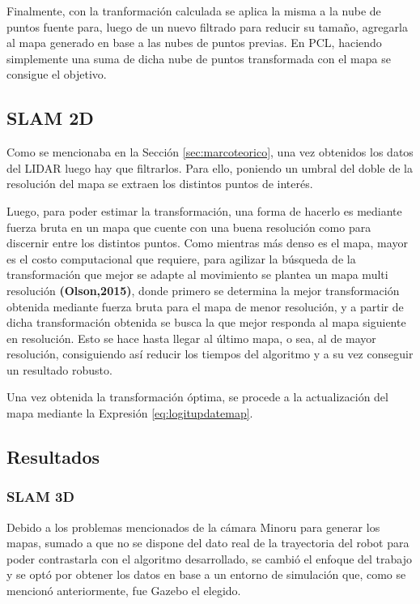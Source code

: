 Finalmente, con la tranformación calculada se aplica la misma a la nube de puntos fuente para, luego de un nuevo filtrado para reducir su tamaño, agregarla al mapa generado en base a las nubes de puntos previas. En PCL, haciendo simplemente una suma de dicha nube de puntos transformada con el mapa se consigue el objetivo.

\subsection{SLAM 2D}
Como se mencionaba en la Sección \ref{sec:marcoteorico}, una vez obtenidos los datos del LIDAR luego hay que filtrarlos. Para ello, poniendo un umbral del doble de la resolución del mapa se extraen los distintos puntos de interés.

Luego, para poder estimar la transformación, una forma de hacerlo es mediante fuerza bruta en un mapa que cuente con una buena resolución como para discernir entre los distintos puntos. Como mientras más denso es el mapa, mayor es el costo computacional que requiere, para agilizar la búsqueda de la transformación que mejor se adapte al movimiento se plantea un mapa multi resolución \textbf{(Olson,2015)}, donde primero se determina la mejor transformación obtenida mediante fuerza bruta para el mapa de menor resolución, y a partir de dicha transformación obtenida se busca la que mejor responda al mapa siguiente en resolución. Esto se hace hasta llegar al último mapa, o sea, al de mayor resolución, consiguiendo así reducir los tiempos del algoritmo y a su vez conseguir un resultado robusto.

Una vez obtenida la transformación óptima, se procede a la actualización del mapa mediante la Expresión \ref{eq:logitupdatemap}.

\subsection{Resultados}

\subsubsection{SLAM 3D}
Debido a los problemas mencionados de la cámara Minoru para generar los mapas, sumado a que no se dispone del dato real de la trayectoria del robot para poder contrastarla con el algoritmo desarrollado, se cambió el enfoque del trabajo y se optó por obtener los datos en base a un entorno de simulación que, como se mencionó anteriormente, fue Gazebo el elegido. 

